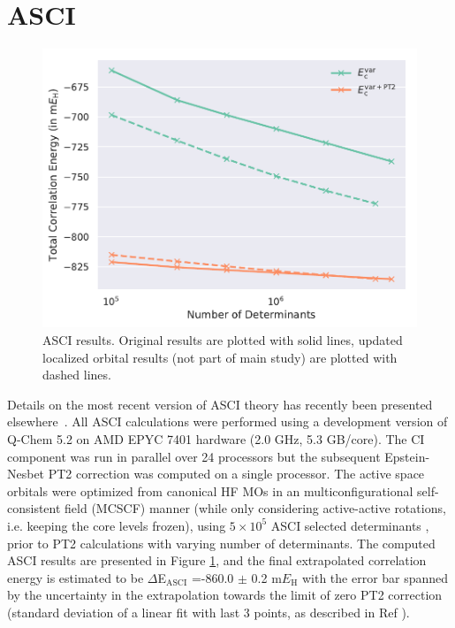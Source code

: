 \documentclass[journal=jcp,manuscript=suppinfo]{achemso}
\begin{document}
\section{ASCI}
\label{sec:asci}
%
\begin{figure}[ht!]
\begin{center}
\includegraphics[scale=0.75]{figures/asci/asci.pdf}
\caption{ASCI results. Original results are plotted with solid lines, updated localized orbital results (not part of main study) are plotted with dashed lines.}
\label{asci_SI_fig}
\end{center}
\vspace{-0.6cm}
\end{figure}
%
Details on the most recent version of ASCI theory has recently been presented elsewhere~\cite{tubman_whaley_selected_ci_jctc_2020,tubman_whaley_selected_ci_pt_arxiv_2018}. 
All ASCI calculations were performed using a development version of Q-Chem 5.2\cite{shao2015advances}  on AMD EPYC 7401 hardware (2.0 GHz, 5.3 GB/core). The CI component was run in parallel over 24 processors but the subsequent Epstein-Nesbet PT2 correction was computed on a single processor. The active space orbitals were optimized from canonical HF MOs in an multiconfigurational self-consistent field (MCSCF) manner (while only considering active-active rotations, i.e. keeping the core levels frozen), using $5\times 10^5$ ASCI selected determinants  \cite{levine2020casscf}, prior to PT2 calculations with varying number of determinants. The computed ASCI results are presented in  Figure \ref{asci_SI_fig}, and the final extrapolated correlation energy is estimated to be $\Delta$E$_\textrm{ASCI}$ =-860.0 $\pm$ 0.2 m$E_{\text{H}}$ with the error bar spanned by the uncertainty in the extrapolation towards the limit of zero PT2 correction (standard deviation of a linear fit with last 3 points, as described in Ref ).
\end{document}
